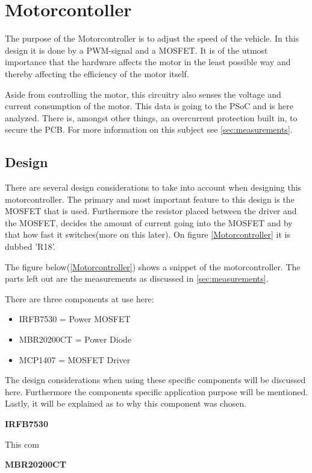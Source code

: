 \section{Motorcontoller}
The purpose of the Motorcontroller is to adjust the speed of the vehicle. In this design it is done by a PWM-signal and a MOSFET. It is of the utmost importance that the hardware affects the motor in the least possible way and thereby affecting the efficiency of the motor itself.

Aside from controlling the motor, this circuitry also senses the voltage and current consumption of the motor. This data is going to the PSoC and is here analyzed. There is, amongst other things, an overcurrent protection built in, to secure the PCB. For more information on this subject see \vref{sec:measurements}.

\subsection{Design}
There are several design considerations to take into account when designing this motorcontroller. The primary and most important feature to this design is the MOSFET that is used. Furthermore the resistor placed between the driver and the MOSFET, decides the amount of current going into the MOSFET and by that how fast it switches(more on this later). On figure \vref{Motorcontroller} it is dubbed 'R18'. 

The figure below(\vref{Motorcontroller}) shows a snippet of the motorcontroller. The parts left out are the measurements as discussed in \vref{sec:measurements}.

There are three components at use here:

\begin{itemize}
	\item{IRFB7530 = Power MOSFET}
	\item{MBR20200CT = Power Diode}
	\item{MCP1407 = MOSFET Driver}
\end{itemize}

The design considerations when using these specific components will be discussed here. Furthermore the components specific application purpose will be mentioned. Lastly, it will be explained as to why this component was chosen.  

\textbf{IRFB7530} 

This com

\textbf{MBR20200CT} 

